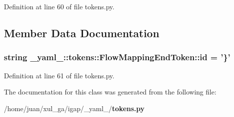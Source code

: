 Definition at line 60 of file tokens.py.

\subsection{Member Data Documentation}
\subsubsection{\setlength{\rightskip}{0pt plus 5cm}string {\bf \_\-yaml\_\-::tokens::FlowMappingEndToken::id} = '\}'\hspace{0.3cm}{\tt  [static]}}\label{class__yaml___1_1tokens_1_1FlowMappingEndToken_2dfdb8af8613b24c46a93db9bade5f9c}




Definition at line 61 of file tokens.py.

The documentation for this class was generated from the following file:\begin{CompactItemize}
\item 
/home/juan/xul\_\-ga/igap/\_\-yaml\_\-/{\bf tokens.py}\end{CompactItemize}
